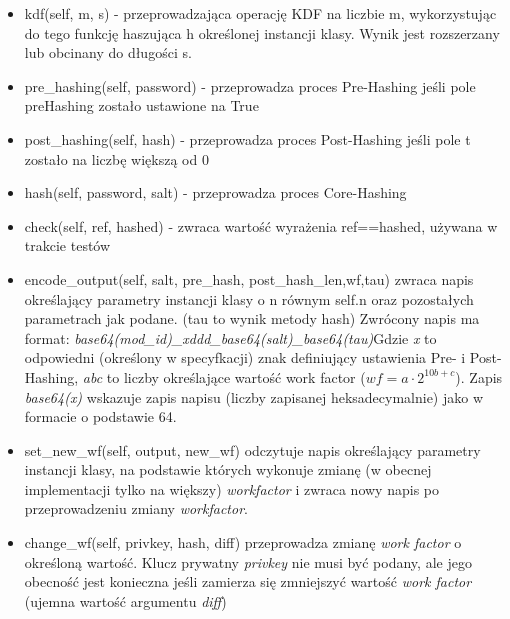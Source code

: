 \documentclass[a4paper,titleauthor]{mwart}
\begin{document}
\begin{itemize}
	\item kdf(self, m, s) - przeprowadzająca operację KDF na liczbie m, wykorzystując do tego funkcję haszująca h określonej instancji klasy. Wynik jest rozszerzany lub obcinany do długości s.
	\item pre\_hashing(self, password) - przeprowadza proces Pre-Hashing jeśli pole preHashing zostało ustawione na True
	\item post\_hashing(self, hash) - przeprowadza proces Post-Hashing jeśli pole t zostało na liczbę większą od 0
	\item hash(self, password, salt) - przeprowadza proces Core-Hashing
	\item check(self, ref, hashed) - zwraca wartość wyrażenia ref==hashed, używana w trakcie testów
	\item encode\_output(self, salt, pre\_hash, post\_hash\_len,wf,tau) zwraca napis określający parametry instancji klasy o n równym self.n oraz pozostałych parametrach jak podane. (tau to wynik metody hash)
	Zwrócony napis ma format: \textit{base64(mod\_id)\_xddd\_base64(salt)\_base64(tau)}Gdzie \textit{x} to odpowiedni (określony w specyfkacji) znak definiujący ustawienia Pre- i Post- Hashing, \textit{abc} to liczby określające wartość work factor ($wf=a\cdot 2^{10b + c}$). Zapis \textit{base64(x)} wskazuje zapis napisu (liczby zapisanej heksadecymalnie) jako w formacie o podstawie 64.
	\item set\_new\_wf(self, output, new\_wf) odczytuje napis określający parametry instancji klasy, na podstawie których wykonuje zmianę (w obecnej implementacji tylko na większy) \textit{workfactor}
	i zwraca nowy napis po przeprowadzeniu zmiany \textit{workfactor}.
	\item change\_wf(self, privkey, hash, diff) przeprowadza zmianę \textit{work factor} o określoną wartość. Klucz prywatny \textit{privkey} nie musi być podany, ale jego obecność jest konieczna jeśli zamierza się zmniejszyć wartość \textit{work factor} (ujemna wartość argumentu \textit{diff})
\end{itemize}
\end{document}
